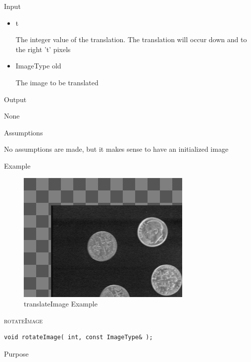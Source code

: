 \documentclass[pdftex, 11pt]{article}
\begin{document}
\begin{description}
\begin{description}
			\item{Input}

				\begin{itemize}

					\item{t}

						The integer value of the translation. The
						translation will occur down and 
						to the right 't' pixels

					\item{ImageType old}

						The image to be translated

				\end{itemize}

			\item{Output}

				None

			\item{Assumptions}

				No assumptions are made, but it makes sense to have
				an initialized image

			\item{Example}

				\begin{figure}[p]
					\centering
					\caption{translateImage Example}
				\includegraphics{images/outtrans.png}
			\end{figure}

		\end{description}


	\item{\textsc{rotateImage}}
		\begin{description}

\begin{lstlisting}
void rotateImage( int, const ImageType& );
\end{lstlisting}

			\item{Purpose}


\end{description}
\end{description}
\end{document}
